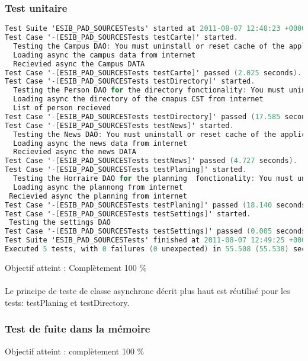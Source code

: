 		 		 \subsubsection*{Test unitaire}
		 		 \begin{lstlisting}[language=C,caption = Log des test unitaires]
Test Suite 'ESIB_PAD_SOURCESTests' started at 2011-08-07 12:48:23 +0000
Test Case '-[ESIB_PAD_SOURCESTests testCarte]' started.
  Testing the Campus DAO: You must uninstall or reset cache of the application before testing
  Loading async the campus data from internet
  Recievied async the Campus DATA
Test Case '-[ESIB_PAD_SOURCESTests testCarte]' passed (2.025 seconds).
Test Case '-[ESIB_PAD_SOURCESTests testDirectory]' started.
  Testing the Person DAO for the directory fonctionality: You must uninstall or reset cache of the application before testing
  Loading async the directory of the cmapus CST from internet
  List of person recieved
Test Case '-[ESIB_PAD_SOURCESTests testDirectory]' passed (17.585 seconds).
Test Case '-[ESIB_PAD_SOURCESTests testNews]' started.
  Testing the News DAO: You must uninstall or reset cache of the application before testing
  Loading async the news data from internet
  Recievied async the news DATA
Test Case '-[ESIB_PAD_SOURCESTests testNews]' passed (4.727 seconds).
Test Case '-[ESIB_PAD_SOURCESTests testPlaning]' started.
  Testing the Horraire DAO for the planning  fonctionality: You must uninstall or reset cache of the application before testing
  Loading async the plannong from internet
 Recievied async the planning from internet
Test Case '-[ESIB_PAD_SOURCESTests testPlaning]' passed (18.140 seconds).
Test Case '-[ESIB_PAD_SOURCESTests testSettings]' started.
 Testing the settings DAO
Test Case '-[ESIB_PAD_SOURCESTests testSettings]' passed (0.005 seconds).
Test Suite 'ESIB_PAD_SOURCESTests' finished at 2011-08-07 12:49:25 +0000.
Executed 5 tests, with 0 failures (0 unexpected) in 55.508 (55.538) seconds
		 		 \end{lstlisting}
		 		Objectif atteint : {\color{green}Complètement 100 \% \CheckedBox}\\
		 		\\
		 		Le principe de teste de classe asynchrone décrit plus haut est réutilisé pour les tests: testPlaning et testDirectory.
		 		 \subsubsection*{Test de fuite dans la mémoire}
		 		 Objectif atteint : {\color{green}complètement 100 \% \CheckedBox}\\


